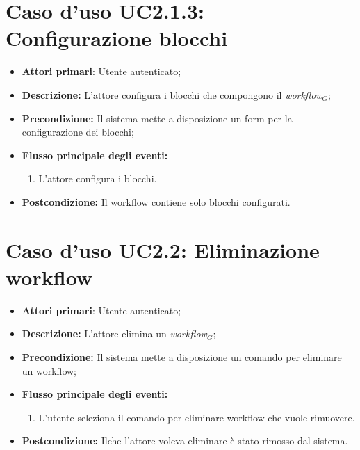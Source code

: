 		\section{Caso d'uso UC2.1.3: Configurazione blocchi }
		\begin{itemize}
			\item \textbf{Attori primari}: Utente autenticato;
			\item \textbf{Descrizione:} L'attore configura i blocchi che compongono il \textit{workflow$_{G}$};
			\item \textbf{Precondizione:} Il sistema mette a disposizione un form per la configurazione dei blocchi;
			\item \textbf{Flusso principale degli eventi:}
			\begin{enumerate}
				\item L'attore configura i blocchi.
			\end{enumerate}
			\item \textbf{Postcondizione:} Il workflow contiene solo blocchi configurati.
		\end{itemize}
		\section{Caso d'uso UC2.2: Eliminazione workflow}
		\begin{itemize}
			\item \textbf{Attori primari}: Utente autenticato;
			\item \textbf{Descrizione:} L'attore elimina un \textit{workflow$_{G}$};
			\item \textbf{Precondizione:} Il sistema mette a disposizione un comando per eliminare un workflow;
			\item \textbf{Flusso principale degli eventi:}
			\begin{enumerate}
				\item L'utente seleziona il comando per eliminare workflow che vuole rimuovere.
			\end{enumerate}
			\item \textbf{Postcondizione:} Ilche l'attore voleva eliminare è stato rimosso dal sistema.
		\end{itemize}
